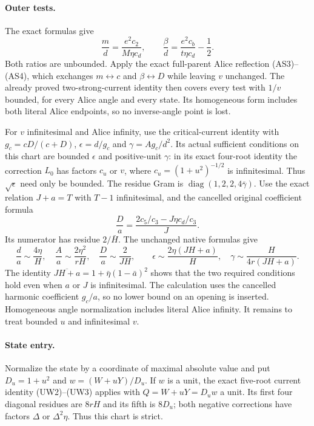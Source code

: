 \paragraph{Outer tests.}
The exact formulas give
\[
 \frac md=\frac{e^2c_2}{M\eta c_d},\qquad
 \frac\beta d=\frac{e^2c_b}{t\eta c_d}-\frac12.
\]
Both ratios are unbounded. Apply the exact full-parent Alice reflection
(AS3)--(AS4), which exchanges $m\leftrightarrow c$ and
$\beta\leftrightarrow D$ while leaving $v$ unchanged. The already
proved two-strong-current identity then covers every test with $1/v$
bounded, for every Alice angle and every state. Its homogeneous form
includes both literal Alice endpoints, so no inverse-angle point is lost.

For $v$ infinitesimal and Alice infinity, use the critical-current
identity with $g_c=cD/(c+D)$, $\epsilon=d/g_c$ and
$\gamma=Ag_c/d^2$. Its actual sufficient conditions on this chart
are bounded $\epsilon$ and positive-unit $\gamma$: in its exact
four-root identity the correction $L_0$ has factors $c_u$ or $v$,
where $c_u=(1+u^2)^{-1/2}$ is infinitesimal. Thus $\sqrt\epsilon$
need only be bounded. The residue Gram is
$\operatorname{diag}(1,2,2,4\bar\gamma)$.
Use the exact relation $J+a=T$ with $T-1$ infinitesimal, and the
cancelled original coefficient formula
\[
 \frac Da=\frac{2c_5/c_3-J\eta c_d/c_3}{J}.
\]
Its numerator has residue $2/\bar H$. The unchanged native formulas give
\[
 \frac d a\sim\frac{4\eta}{H},\quad
 \frac A a\sim\frac{2\eta^2}{rH},\quad
 \frac D a\sim\frac2{JH},\qquad
 \epsilon\sim\frac{2\eta(JH+a)}H,\quad
 \gamma\sim\frac{H}{4r(JH+a)}.
\]
The identity
$\overline{JH+a}=1+\bar\eta(1-\bar a)^2$ shows that the two required
conditions hold even when $a$ or $J$ is infinitesimal. The calculation
uses the cancelled harmonic coefficient $g_c/a$, so no lower bound
on an opening is inserted. Homogeneous angle normalization includes
literal Alice infinity. It remains to treat bounded $u$ and
infinitesimal $v$.

\paragraph{State entry.}
Normalize the state by a coordinate of maximal absolute value and put
$D_u=1+u^2$ and $w=(W+uY)/D_u$. If $w$ is a unit, the exact five-root
current identity (UW2)--(UW3) applies with $Q=W+uY=D_uw$ a unit.
Its first four diagonal residues are $8rH$ and its fifth is
$8D_u$; both negative corrections have factors $\Delta$ or
$\Delta^2\eta$. Thus this chart is strict.

